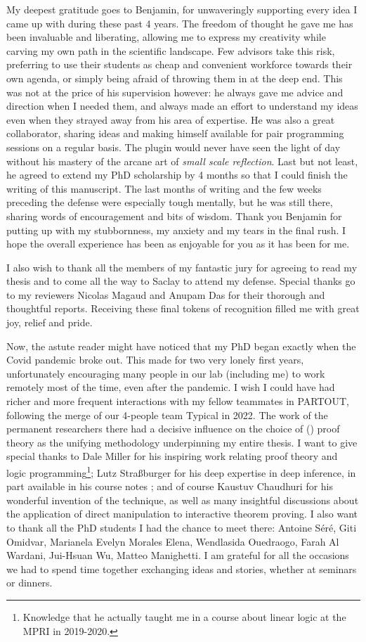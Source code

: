 My deepest gratitude goes to Benjamin, for unwaveringly supporting every idea I came up with during these past 4 years. The freedom of thought he gave me has been invaluable and liberating, allowing me to express my creativity while carving my own path in the scientific landscape. Few advisors take this risk, preferring to use their students as cheap and convenient workforce towards their own agenda, or simply being afraid of throwing them in at the deep end. This was not at the price of his supervision however: he always gave me advice and direction when I needed them, and always made an effort to understand my ideas even when they strayed away from his area of expertise. He was also a great collaborator, sharing ideas and making himself available for pair programming sessions on a regular basis. The  plugin would never have seen the light of day without his mastery of the arcane art of \emph{small scale reflection}. Last but not least, he agreed to extend my PhD scholarship by 4 months so that I could finish the writing of this manuscript. The last months of writing and the few weeks preceding the defense were especially tough mentally, but he was still there, sharing words of encouragement and bits of wisdom. Thank you Benjamin for putting up with my stubbornness, my anxiety and my tears in the final rush. I hope the overall experience has been as enjoyable for you as it has been for me.

I also wish to thank all the members of my fantastic jury for agreeing to read my thesis and to come all the way to Saclay to attend my defense. Special thanks go to my reviewers Nicolas Magaud and Anupam Das for their thorough and thoughtful reports. Receiving these final tokens of recognition filled me with great joy, relief and pride.

Now, the astute reader might have noticed that my PhD began exactly when the Covid pandemic broke out. This made for two very lonely first years, unfortunately encouraging many people in our lab (including me) to work remotely most of the time, even after the pandemic. I wish I could have had richer and more frequent interactions with my fellow teammates in PARTOUT, following the merge of our 4-people team Typical in 2022. The work of the permanent researchers there had a decisive influence on the choice of () proof theory as the unifying methodology underpinning my entire thesis. I want to give special thanks to Dale Miller for his inspiring work relating proof theory and logic programming\footnote{Knowledge that he actually taught me in a course about linear logic at the MPRI in 2019-2020.}; Lutz Straßburger for his deep expertise in deep inference, in part available in his course notes \cite{tubella:hal-02390267}; and of course Kaustuv Chaudhuri for his wonderful invention of the  technique, as well as many insightful discussions about the application of direct manipulation to interactive theorem proving. I also want to thank all the PhD students I had the chance to meet there: Antoine Séré, Giti Omidvar, Marianela Evelyn Morales Elena, Wendlasida Ouedraogo, Farah Al Wardani, Jui-Hsuan Wu, Matteo Manighetti. I am grateful for all the occasions we had to spend time together exchanging ideas and stories, whether at seminars or dinners.

